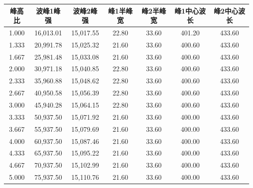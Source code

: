 \documentclass{article}
\numberwithin{equation}{subsection}
\begin{document}
\begin{table}[h]
    \begin{tabular}{|c|c|c|c|c|c|c|}\hline
        峰高比&波峰1峰强&波峰2峰强&峰1半峰宽&峰2半峰宽&峰1中心波长&峰2中心波长\\\hline
        1.000&16,013.01
        &15,017.55
        &22.80
        &33.60
        &401.20
        &433.60\\

        1.333&20,991.78
        &15,025.32
        &21.60
        &33.60
        &400.60
        &433.60\\

        1.667&25,981.48
        &15,033.08
        &21.60
        &33.60
        &400.60
        &433.60\\

        2.000&30,971.18
        &15,040.85
        &22.80
        &33.60
        &400.60
        &433.60\\

        2.333&35,960.88
        &15,048.62
        &22.80
        &33.60
        &400.60
        &433.60\\

        2.667&40,950.58
        &15,056.39
        &22.80
        &33.60
        &400.60
        &433.60\\

        3.000&45,940.28
        &15,064.15
        &22.80
        &33.60
        &400.60
        &433.60\\

        3.333&50,937.50
        &15,071.92
        &21.60
        &33.60
        &400.00
        &433.60\\

        3.667&55,937.50
        &15,079.69
        &21.60
        &33.60
        &400.00
        &433.60\\

        4.000&60,937.50
        &15,087.46
        &21.60
        &33.60
        &400.00
        &433.60\\

        4.333&65,937.50
        &15,095.22
        &21.60
        &33.60
        &400.00
        &433.60\\

        4.667&70,937.50
        &15,102.99
        &21.60
        &33.60
        &400.00
        &433.60\\

        5.000&75,937.50
        &15,110.76
        &21.60
        &33.60
        &400.00
        &433.60\\


\end{tabular}
\end{table}
\end{document}
